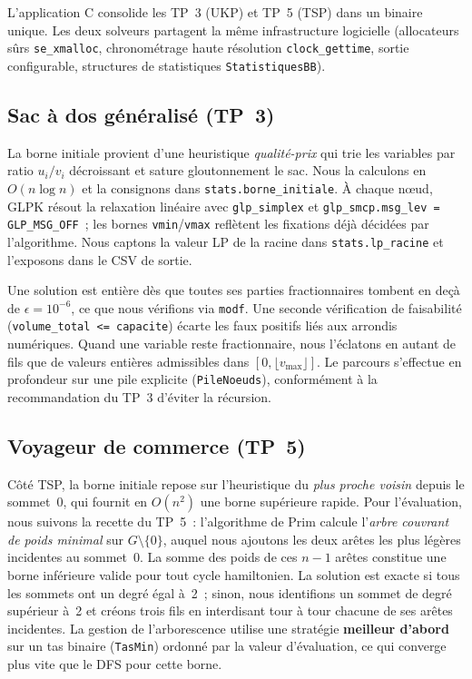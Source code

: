 \documentclass[11pt,a4paper]{article}
\begin{document}
L'application C consolide les TP~3 (UKP) et TP~5 (TSP) dans un binaire unique. Les deux solveurs partagent la même infrastructure logicielle (allocateurs sûrs \texttt{se\_xmalloc}, chronométrage haute résolution \texttt{clock\_gettime}, sortie configurable, structures de statistiques \texttt{StatistiquesBB}).

\subsection{Sac à dos généralisé (TP~3)}

La borne initiale provient d'une heuristique \emph{qualité-prix} qui trie les variables par ratio $u_i / v_i$ décroissant et sature gloutonnement le sac. Nous la calculons en $O(n \log n)$ et la consignons dans \texttt{stats.borne\_initiale}. À chaque nœud, GLPK résout la relaxation linéaire avec \texttt{glp\_simplex} et \texttt{glp\_smcp.msg\_lev = GLP\_MSG\_OFF}~; les bornes \texttt{vmin}/\texttt{vmax} reflètent les fixations déjà décidées par l'algorithme. Nous captons la valeur LP de la racine dans \texttt{stats.lp\_racine} et l'exposons dans le CSV de sortie.

Une solution est entière dès que toutes ses parties fractionnaires tombent en deçà de $\epsilon = 10^{-6}$, ce que nous vérifions via \texttt{modf}. Une seconde vérification de faisabilité (\texttt{volume\_total <= capacite}) écarte les faux positifs liés aux arrondis numériques. Quand une variable reste fractionnaire, nous l'éclatons en autant de fils que de valeurs entières admissibles dans $[0, \lfloor v_{\max} \rfloor]$. Le parcours s'effectue en profondeur sur une pile explicite (\texttt{PileNoeuds}), conformément à la recommandation du TP~3 d'éviter la récursion.

\subsection{Voyageur de commerce (TP~5)}

Côté TSP, la borne initiale repose sur l'heuristique du \emph{plus proche voisin} depuis le sommet~0, qui fournit en $O(n^2)$ une borne supérieure rapide. Pour l'évaluation, nous suivons la recette du TP~5~: l'algorithme de Prim calcule l'\emph{arbre couvrant de poids minimal} sur $G \setminus \{0\}$, auquel nous ajoutons les deux arêtes les plus légères incidentes au sommet~0. La somme des poids de ces $n-1$ arêtes constitue une borne inférieure valide pour tout cycle hamiltonien. La solution est exacte si tous les sommets ont un degré égal à~2~; sinon, nous identifions un sommet de degré supérieur à~2 et créons trois fils en interdisant tour à tour chacune de ses arêtes incidentes. La gestion de l'arborescence utilise une stratégie \textbf{meilleur d'abord} sur un tas binaire (\texttt{TasMin}) ordonné par la valeur d'évaluation, ce qui converge plus vite que le DFS pour cette borne.
\end{document}
